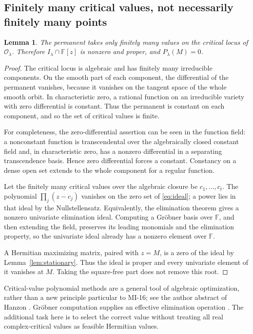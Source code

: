 \documentclass[11pt]{article}
\newcommand{\F}{\mathbb F}
\newtheorem{lemma}[theorem]{Lemma}
\theoremstyle{definition}\newtheorem{definition}[theorem]{Definition}
\theoremstyle{remark}\newtheorem{remark}[theorem]{Remark}
\begin{document}
\subsection{Finitely many critical values, not necessarily finitely many points}
\begin{lemma}\label{lem:finite}
The permanent takes only finitely many values on the critical locus of $\mathcal O_\lambda$. Therefore $I_\lambda\cap\F[z]$ is nonzero and proper, and $P_\lambda(M)=0$.
\end{lemma}
\begin{proof}
The critical locus is algebraic and has finitely many irreducible components. On the smooth part of each component, the differential of the permanent vanishes, because it vanishes on the tangent space of the whole smooth orbit. In characteristic zero, a rational function on an irreducible variety with zero differential is constant. Thus the permanent is constant on each component, and so the set of critical values is finite.

For completeness, the zero-differential assertion can be seen in the function field: a nonconstant function is transcendental over the algebraically closed constant field and, in characteristic zero, has a nonzero differential in a separating transcendence basis. Hence zero differential forces a constant. Constancy on a dense open set extends to the whole component for a regular function.

Let the finitely many critical values over the algebraic closure be $c_1,\ldots,c_t$. The polynomial $\prod_j(z-c_j)$ vanishes on the zero set of \eqref{eq:ideal}; a power lies in that ideal by the Nullstellensatz. Equivalently, the elimination theorem gives a nonzero univariate elimination ideal. Computing a Gr\"obner basis over $\F$, and then extending the field, preserves its leading monomials and the elimination property, so the univariate ideal already has a nonzero element over $\F$.

A Hermitian maximizing matrix, paired with $z=M$, is a zero of the ideal by Lemma~\ref{lem:stationary}. Thus the ideal is proper and every univariate element of it vanishes at $M$. Taking the square-free part does not remove this root.
\end{proof}
Critical-value polynomial methods are a general tool of algebraic optimization, rather than a new principle particular to MI-16; see the author abstract of Hanzon \cite{hanzon}. Gr\"obner computation supplies an effective elimination operation \cite{buchberger}. The additional task here is to select the correct value without treating all real complex-critical values as feasible Hermitian values.
\end{document}
